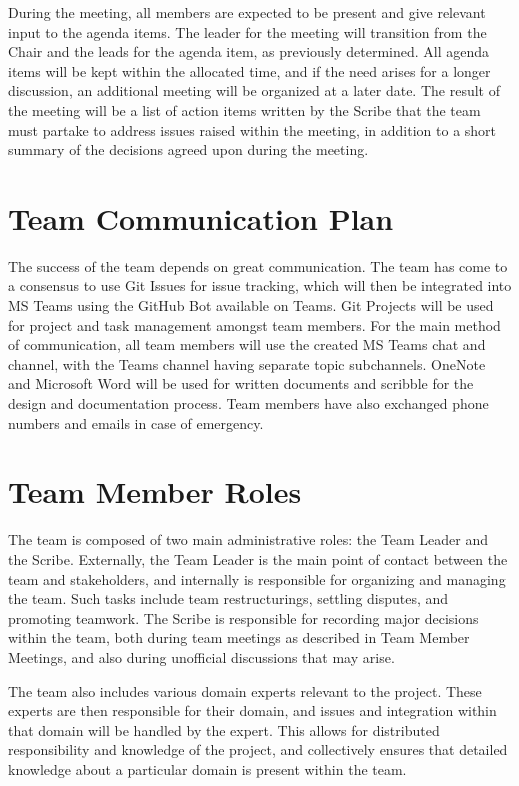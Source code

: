 \documentclass{article}
\begin{document}
During the meeting, all members are expected to be present and give relevant input to the agenda items. The leader for the meeting will transition from the Chair and the leads for the agenda item, as previously determined. All agenda items will be kept within the allocated time, and if the need arises for a longer discussion, an additional meeting will be organized at a later date. The result of the meeting will be a list of action items written by the Scribe that the team must partake to address issues raised within the meeting, in addition to a short summary of the decisions agreed upon during the meeting. 

\section{Team Communication Plan}

The success of the team depends on great communication. The team has come to a consensus to use Git Issues for issue tracking, which will then be integrated into MS Teams using the GitHub Bot available on Teams. Git Projects will be used for project and task management amongst team members. For the main method of communication, all team members will use the created MS Teams chat and channel, with the Teams channel having separate topic subchannels. OneNote and Microsoft Word will be used for written documents and scribble for the design and documentation process. Team members have also exchanged phone numbers and emails in case of emergency.  

\section{Team Member Roles}

The team is composed of two main administrative roles: the Team Leader and the Scribe. Externally, the Team Leader is the main point of contact between the team and stakeholders, and internally is responsible for organizing and managing the team. Such tasks include team restructurings, settling disputes, and promoting teamwork. The Scribe is responsible for recording major decisions within the team, both during team meetings as described in Team Member Meetings, and also during unofficial discussions that may arise.  

The team also includes various domain experts relevant to the project. These experts are then responsible for their domain, and issues and integration within that domain will be handled by the expert. This allows for distributed responsibility and knowledge of the project, and collectively ensures that detailed knowledge about a particular domain is present within the team. 
\end{document}
